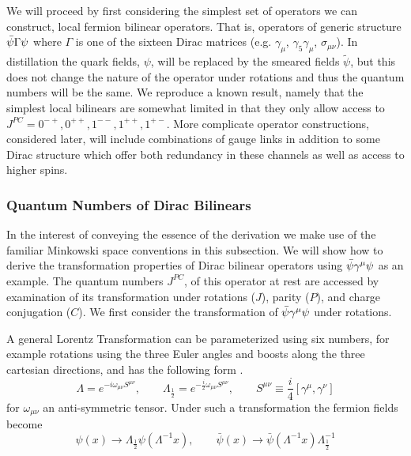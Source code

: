We will proceed by first considering the simplest set of operators we can construct, local fermion bilinear operators. That is, operators of generic structure $\bar{\psi} \Gamma \psi$ where $\Gamma$ is one of the sixteen Dirac matrices (e.g. $\gamma_\mu$, $\gamma_5\gamma_\mu$, $\sigma_{\mu\nu}$).  In distillation the quark fields, $\psi$, will be replaced by the smeared fields $\tilde{\psi}$, but this does not change the nature of the operator under rotations and thus the quantum numbers will be the same. We reproduce a known result, namely that the simplest local bilinears are somewhat limited in that they only allow access to $J^{PC} = 0^{-+}, 0^{++}, 1^{--}, 1^{++}, 1^{+-}$. More complicate operator constructions, considered later, will  include combinations of gauge links in addition to some Dirac structure which offer both redundancy in these channels as well as access to higher spins. 



\subsubsection{Quantum Numbers of Dirac Bilinears} \label{sec::bilinearTransformations}
In the interest of conveying the essence of the derivation we make use of the familiar Minkowski space conventions in this subsection. We will show how to derive the transformation properties of Dirac bilinear operators using $\bar{\psi} \gamma^\mu \psi$ as an example. The quantum numbers $J^{PC}$, of this operator at rest are accessed by examination of its transformation under rotations ($J$), parity ($P$), and charge conjugation ($C$). We first consider the transformation of $\bar{\psi} \gamma^\mu \psi$ under rotations. 
 
A general Lorentz Transformation can be parameterized using six numbers, for example rotations using the three Euler angles and boosts along the three cartesian directions, and has the following form \cite{0201503972}.
\begin{equation*}
\Lambda = e^{-i\omega_{\mu\nu}S^{\mu\nu}}, \qquad \Lambda_{\frac{1}{2}} = e^{-\frac{i}{2}\omega_{\mu\nu}S^{\mu\nu}}, \qquad S^{\mu\nu} \equiv \frac{i}{4}\left[\gamma^{\mu},\gamma^{\nu}\right]
\end{equation*}
for $\omega_{\mu\nu}$ an anti-symmetric tensor. Under such a transformation the fermion fields become 
\begin{equation}
\psi(x) \rightarrow \Lambda_{\frac{1}{2}}\psi(\Lambda^{-1}x), \qquad \bar{\psi}(x) \rightarrow \bar{\psi}(\Lambda^{-1}x)\Lambda^{-1}_{\frac{1}{2}}
\end{equation}

